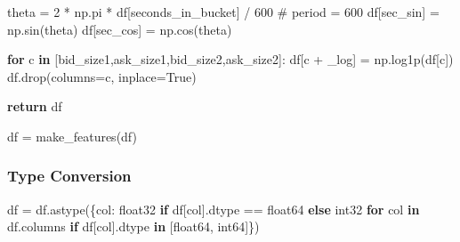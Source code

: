 \documentclass[
  letterpaper,
  DIV=11,
  numbers=noendperiod]{scrartcl}
\newenvironment{Shaded}{\begin{snugshade}}{\end{snugshade}}
\newcommand{\CommentTok}[1]{\textcolor[rgb]{0.37,0.37,0.37}{#1}}
\newcommand{\ControlFlowTok}[1]{\textcolor[rgb]{0.00,0.23,0.31}{\textbf{#1}}}
\newcommand{\DecValTok}[1]{\textcolor[rgb]{0.68,0.00,0.00}{#1}}
\newcommand{\KeywordTok}[1]{\textcolor[rgb]{0.00,0.23,0.31}{\textbf{#1}}}
\newcommand{\NormalTok}[1]{\textcolor[rgb]{0.00,0.23,0.31}{#1}}
\newcommand{\OperatorTok}[1]{\textcolor[rgb]{0.37,0.37,0.37}{#1}}
\newcommand{\StringTok}[1]{\textcolor[rgb]{0.13,0.47,0.30}{#1}}
\newcommand{\VariableTok}[1]{\textcolor[rgb]{0.07,0.07,0.07}{#1}}
\begin{document}
\begin{Shaded}
\begin{Highlighting}[]
\NormalTok{    theta }\OperatorTok{=} \DecValTok{2} \OperatorTok{*}\NormalTok{ np.pi }\OperatorTok{*}\NormalTok{ df[}\StringTok{\textquotesingle{}seconds\_in\_bucket\textquotesingle{}}\NormalTok{] }\OperatorTok{/} \DecValTok{600} \CommentTok{\# period = 600}
\NormalTok{    df[}\StringTok{\textquotesingle{}sec\_sin\textquotesingle{}}\NormalTok{] }\OperatorTok{=}\NormalTok{ np.sin(theta)}
\NormalTok{    df[}\StringTok{\textquotesingle{}sec\_cos\textquotesingle{}}\NormalTok{] }\OperatorTok{=}\NormalTok{ np.cos(theta)}

    \ControlFlowTok{for}\NormalTok{ c }\KeywordTok{in}\NormalTok{ [}\StringTok{\textquotesingle{}bid\_size1\textquotesingle{}}\NormalTok{,}\StringTok{\textquotesingle{}ask\_size1\textquotesingle{}}\NormalTok{,}\StringTok{\textquotesingle{}bid\_size2\textquotesingle{}}\NormalTok{,}\StringTok{\textquotesingle{}ask\_size2\textquotesingle{}}\NormalTok{]:}
\NormalTok{        df[c }\OperatorTok{+} \StringTok{\textquotesingle{}\_log\textquotesingle{}}\NormalTok{] }\OperatorTok{=}\NormalTok{ np.log1p(df[c])}
\NormalTok{        df.drop(columns}\OperatorTok{=}\NormalTok{c, inplace}\OperatorTok{=}\VariableTok{True}\NormalTok{)}

    \ControlFlowTok{return}\NormalTok{ df}
  
\NormalTok{df }\OperatorTok{=}\NormalTok{ make\_features(df)}
\end{Highlighting}
\end{Shaded}

\subsubsection{Type Conversion}\label{type-conversion}

\begin{Shaded}
\begin{Highlighting}[]
\NormalTok{df }\OperatorTok{=}\NormalTok{ df.astype(\{col: }\StringTok{\textquotesingle{}float32\textquotesingle{}} \ControlFlowTok{if}\NormalTok{ df[col].dtype }\OperatorTok{==} \StringTok{\textquotesingle{}float64\textquotesingle{}} \ControlFlowTok{else} \StringTok{\textquotesingle{}int32\textquotesingle{}} 
                \ControlFlowTok{for}\NormalTok{ col }\KeywordTok{in}\NormalTok{ df.columns }
                \ControlFlowTok{if}\NormalTok{ df[col].dtype }\KeywordTok{in}\NormalTok{ [}\StringTok{\textquotesingle{}float64\textquotesingle{}}\NormalTok{, }\StringTok{\textquotesingle{}int64\textquotesingle{}}\NormalTok{]\})}
\end{Highlighting}
\end{Shaded}
\end{document}
